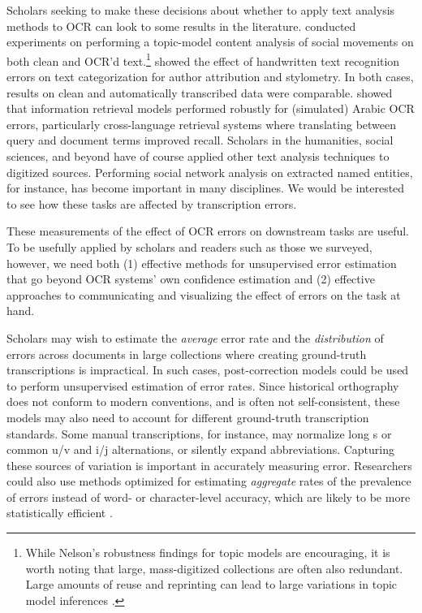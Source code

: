 \documentclass[twoside,11pt]{report}
\begin{document}
Scholars seeking to make these decisions about whether to apply text analysis methods to OCR can look to some results in the literature. \cite{nelson17:_comput_groun_theor} conducted experiments on performing a topic-model content analysis of social movements on both clean and OCR'd text.\footnote{While Nelson's robustness findings for topic models are encouraging, it is worth noting that large, mass-digitized collections are often also redundant. Large amounts of reuse and reprinting can lead to large variations in topic model inferences \citep{schofield16:_compar_apple}.}  \cite{franzini18:_attrib_author_noisy_digit_corres} showed the effect of handwritten text recognition errors on text categorization for author attribution and stylometry. In both cases, results on clean and automatically transcribed data were comparable.  \cite{darwish02:_term_selec_searc_print_arabic} showed that information retrieval models performed robustly for (simulated) Arabic OCR errors, particularly cross-language retrieval systems where translating between query and document terms improved recall. Scholars in the humanities, social sciences, and beyond have of course applied other text analysis techniques to digitized sources. Performing social network analysis on extracted named entities, for instance, has become important in many disciplines. We would be interested to see how these tasks are affected by transcription errors.

These measurements of the effect of OCR errors on downstream tasks are useful. To be usefully applied by scholars and readers such as those we surveyed, however, we need both (1) effective methods for unsupervised error estimation that go beyond OCR systems' own confidence estimation and (2) effective approaches to communicating and visualizing the effect of errors on the task at hand.

Scholars may wish to estimate the \emph{average} error rate and the \emph{distribution} of errors across documents in large collections where creating ground-truth transcriptions is impractical. In such cases, post-correction models could be used to perform unsupervised estimation of error rates. Since historical orthography does not conform to modern conventions, and is often not self-consistent, these models may also need to account for different ground-truth transcription standards. Some manual transcriptions, for instance, may normalize long s or common u/v and i/j alternations, or silently expand abbreviations. Capturing these sources of variation is important in accurately measuring error. Researchers could also use methods optimized for estimating \emph{aggregate} rates of the prevalence of errors instead of word- or character-level accuracy, which are likely to be more statistically efficient \citep{hopkins10:_method_autom_nonpar_conten_analy_social_scien,king17:_comput_assis_keywor_docum_set}.
\end{document}
